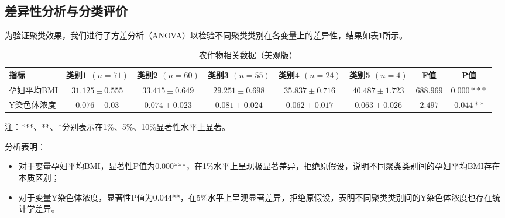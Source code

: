\documentclass{article}
\begin{document}
\subsection{\textbf{差异性分析与分类评价}}
为验证聚类效果，我们进行了方差分析（ANOVA）以检验不同聚类类别在各变量上的差异性，结果如表1所示。
\begin{table}[htbp]
    \centering
    \small  %
    \setlength{\tabcolsep}{3pt}  %
    \begin{tabularx}{\linewidth}{X c c c c c c c}  %
        \toprule
        指标      & 类别1 $(n=71)$     & 类别2 $(n=60)$     & 类别3 $(n=55)$     & 类别4 $(n=24)$     & 类别5 $(n=4)$      & F值        & P值         \\
        \midrule
        孕妇平均BMI & $31.125\pm0.555$ & $33.415\pm0.649$ & $29.251\pm0.698$ & $35.837\pm0.716$ & $40.487\pm1.723$ & $688.969$ & $0.000***$ \\
        Y染色体浓度  & $0.076\pm0.03$   & $0.074\pm0.023$  & $0.081\pm0.024$  & $0.062\pm0.017$  & $0.063\pm0.026$  & $2.497$   & $0.044**$  \\
        \bottomrule
    \end{tabularx}
    \caption{农作物相关数据（美观版）}
    \label{tab:crops_booktabs}
\end{table}


注：***、**、*分别表示在1\%、5\%、10\%显著性水平上显著。

分析表明：
\begin{itemize}
    \item 对于变量孕妇平均BMI，显著性P值为0.000***，在1\%水平上呈现极显著差异，拒绝原假设，说明不同聚类类别间的孕妇平均BMI存在本质区别；
    \item 对于变量Y染色体浓度，显著性P值为0.044**，在5\%水平上呈现显著差异，拒绝原假设，表明不同聚类类别间的Y染色体浓度也存在统计学差异。
\end{itemize}
\end{document}
